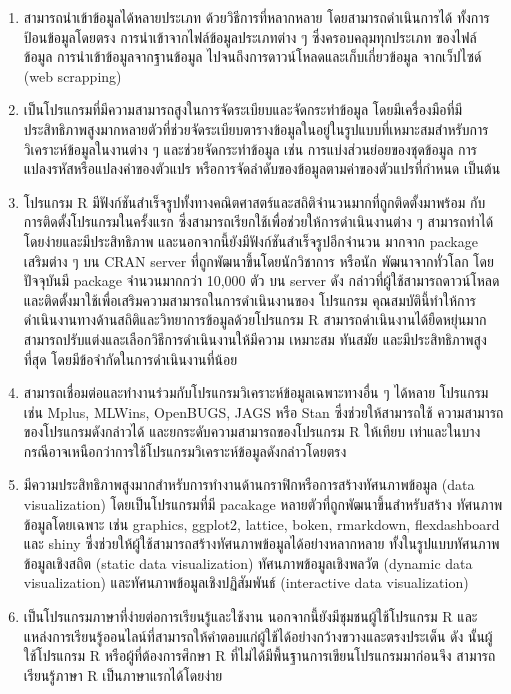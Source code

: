 \documentclass[
  a4paper,
]{book}
\begin{document}
\begin{enumerate}
\def\labelenumi{\arabic{enumi}.}
\item
  สามารถนำเข้าข้อมูลได้หลายประเภท ด้วยวิธีการที่หลากหลาย โดยสามารถดำเนินการได้
  ทั้งการป้อนข้อมูลโดยตรง การนำเข้าจากไฟล์ข้อมูลประเภทต่าง ๆ ซึ่งครอบคลุมทุกประเภท
  ของไฟล์ข้อมูล การนำเข้าข้อมูลจากฐานข้อมูล ไปจนถึงการดาวน์โหลดและเก็บเกี่ยวข้อมูล
  จากเว็ปไซด์ (web scrapping)
\item
  เป็นโปรแกรมที่มีความสามารถสูงในการจัดระเบียบและจัดกระทำข้อมูล โดยมีเครื่องมือที่มี
  ประสิทธิภาพสูงมากหลายตัวที่ช่วยจัดระเบียบตารางข้อมูลในอยู่ในรูปแบบที่เหมาะสมสำหรับการวิเคราะห์ข้อมูลในงานต่าง
  ๆ และช่วยจัดกระทำข้อมูล เช่น การแบ่งส่วนย่อยของชุดข้อมูล
  การแปลงรหัสหรือแปลงค่าของตัวแปร หรือการจัดลำดับของข้อมูลตามค่าของตัวแปรที่กำหนด
  เป็นต้น
\item
  โปรแกรม R มีฟังก์ชันสำเร็จรูปทั้งทางคณิตศาสตร์และสถิติจำนวนมากที่ถูกติดตั้งมาพร้อม
  กับการติดตั้งโปรแกรมในครั้งแรก ซึ่งสามารถเรียกใช้เพื่อช่วยให้การดำเนินงานต่าง ๆ
  สามารถทำได้โดยง่ายและมีประสิทธิภาพ และนอกจากนี้ยังมีฟังก์ชันสำเร็จรูปอีกจำนวน มากจาก
  package เสริมต่าง ๆ บน CRAN server ที่ถูกพัฒนาขึ้นโดยนักวิชาการ หรือนัก
  พัฒนาจากทั่วโลก โดยปัจจุบันมี package จำนวนมากกว่า 10,000 ตัว บน server ดัง
  กล่าวที่ผู้ใช้สามารถดาวน์โหลดและติดตั้งมาใช้เพื่อเสริมความสามารถในการดำเนินงานของ
  โปรแกรม คุณสมบัตินี้ทำให้การดำเนินงานทางด้านสถิติและวิทยาการข้อมูลด้วยโปรแกรม R
  สามารถดำเนินงานได้ยืดหยุ่นมาก สามารถปรับแต่งและเลือกวิธีการดำเนินงานให้มีความ
  เหมาะสม ทันสมัย และมีประสิทธิภาพสูงที่สุด โดยมีข้อจำกัดในการดำเนินงานที่น้อย
\item
  สามารถเชื่อมต่อและทำงานร่วมกับโปรแกรมวิเคราะห์ข้อมูลเฉพาะทางอื่น ๆ ได้หลาย โปรแกรม
  เช่น Mplus, MLWins, OpenBUGS, JAGS หรือ Stan ซึ่งช่วยให้สามารถใช้
  ความสามารถของโปรแกรมดังกล่าวได้ และยกระดับความสามารถของโปรแกรม R ให้เทียบ
  เท่าและในบางกรณีอาจเหนือกว่าการใช้โปรแกรมวิเคราะห์ข้อมูลดังกล่าวโดยตรง
\item
  มีความประสิทธิภาพสูงมากสำหรับการทำงานด้านกราฟิกหรือการสร้างทัศนภาพข้อมูล (data
  visualization) โดยเป็นโปรแกรมที่มี pacakage หลายตัวที่ถูกพัฒนาขึ้นสำหรับสร้าง
  ทัศนภาพข้อมูลโดยเฉพาะ เช่น graphics, ggplot2, lattice, boken, rmarkdown,
  flexdashboard และ shiny ซึ่งช่วยให้ผู้ใช้สามารถสร้างทัศนภาพข้อมูลได้อย่างหลากหลาย
  ทั้งในรูปแบบทัศนภาพข้อมูลเชิงสถิต (static data visualization)
  ทัศนภาพข้อมูลเชิงพลวัต (dynamic data visualization) และทัศนภาพข้อมูลเชิงปฏิสัมพันธ์
  (interactive data visualization)
\item
  เป็นโปรแกรมภาษาที่ง่ายต่อการเรียนรู้และใช้งาน นอกจากนี้ยังมีชุมชนผู้ใช้โปรแกรม R และ
  แหล่งการเรียนรู้ออนไลน์ที่สามารถให้คำตอบแก่ผู้ใช้ได้อย่างกว้างขวางและตรงประเด็น ดัง
  นั้นผู้ใช้โปรแกรม R หรือผู้ที่ต้องการศึกษา R ที่ไม่ได้มีพื้นฐานการเขียนโปรแกรมมาก่อนจึง
  สามารถเรียนรู้ภาษา R เป็นภาษาแรกได้โดยง่าย
\end{enumerate}
\end{document}
